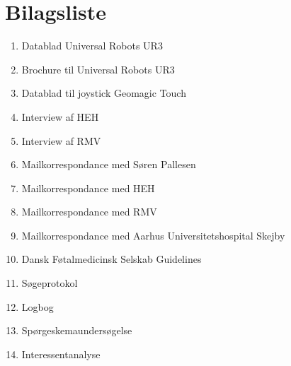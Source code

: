 \chapter{Bilagsliste}
\begin{enumerate}
\item Datablad Universal Robots UR3
\item Brochure til Universal Robots UR3
\item Datablad til joystick Geomagic Touch
\item Interview af HEH
\item Interview af RMV
\item Mailkorrespondance med Søren Pallesen
\item Mailkorrespondance med HEH
\item Mailkorrespondance med RMV
\item Mailkorrespondance med Aarhus Universitetshospital Skejby
\item Dansk Føtalmedicinsk Selskab Guidelines
\item Søgeprotokol
\item Logbog
\item Spørgeskemaundersøgelse
\item Interessentanalyse
\end{enumerate}
